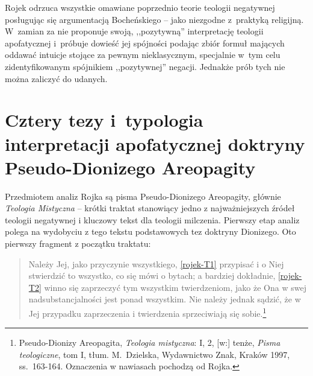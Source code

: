 Rojek odrzuca wszystkie omawiane poprzednio teorie teologii negatywnej posługując się argumentacją Bocheńskiego -- jako niezgodne z~praktyką religijną. W~zamian za nie proponuje swoją, ,,pozytywną'' interpretację teologii apofatycznej i~próbuje dowieść jej spójności podając zbiór formuł mających oddawać intuicje stojące za pewnym nieklasycznym, specjalnie w~tym celu zidentyfikowanym spójnikiem ,,pozytywnej'' negacji. Jednakże prób tych nie można zaliczyć do udanych.







\section{Cztery tezy i~typologia interpretacji apofatycznej doktryny Pseudo-Dionizego Areopagity}

Przedmiotem analiz Rojka są pisma Pseudo-Dionizego Areopagity, głównie
\textit{Teologia Mistyczna} -- krótki traktat stanowiący jedno z najważniejszych
źródeł teologii negatywnej i kluczowy tekst dla teologii milczenia.
Pierwszy etap analiz polega na wydobyciu z tego tekstu podstawowych tez
doktryny Dionizego. Oto pierwszy fragment z początku traktatu:

\begin{quote}
    Należy Jej, jako przyczynie wszystkiego, \eqref{rojek-T1} przypisać i o Niej
stwierdzić to wszystko, co się mówi o bytach; a bardziej dokładnie,
\eqref{rojek-T2} winno się zaprzeczyć tym wszystkim twierdzeniom, jako że Ona w
swej nadsubstancjalności jest ponad wszystkim. Nie należy jednak
sądzić, że w Jej przypadku zaprzeczenia i twierdzenia sprzeciwiają się
sobie.\footnote{
Pseudo-Dionizy Areopagita, \textit{Teologia mistyczna}: I, 2, [w:] tenże, \textit{Pisma teologiczne}, tom I, tłum. M.~Dzielska, Wydawnictwo Znak, Kraków 1997, ss.~163-164.
Oznaczenia w nawiasach pochodzą od Rojka.}
\end{quote}





